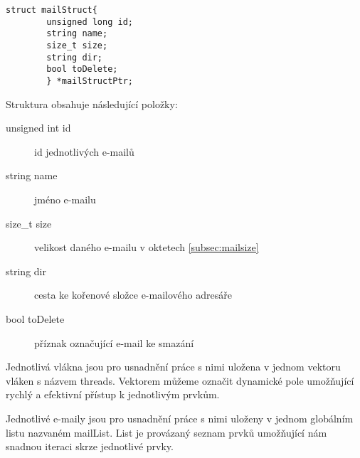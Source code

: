 \documentclass[11pt,a4paper]{report}
\begin{document}
    \lstset{language=C++,frameround=fttt}
    \begin{lstlisting}[frame=trBL]
        struct mailStruct{
        unsigned long id;
        string name;
        size_t size;
        string dir;
        bool toDelete;
        } *mailStructPtr;
    \end{lstlisting}
    Struktura obsahuje následující položky:
    \begin{description}
        \item [unsigned int id] id jednotlivých e-mailů
        \item [string name] jméno e-mailu
        \item [size\_t size] velikost daného e-mailu v oktetech \ref{subsec:mailsize}
        \item [string dir] cesta ke kořenové složce e-mailového adresáře
        \item [bool toDelete] příznak označující e-mail ke smazání
    \end{description}
    Jednotlivá vlákna jsou pro usnadnění práce s nimi uložena v jednom vektoru vláken s názvem threads. Vektorem můžeme označit dynamické pole umožňující rychlý a efektivní přístup k jednotlivým prvkům.\par
    Jednotlivé e-maily jsou pro usnadnění práce s nimi uloženy v jednom globálním listu nazvaném mailList. List je provázaný seznam prvků umožňující nám snadnou iteraci skrze jednotlivé prvky.
\end{document}
